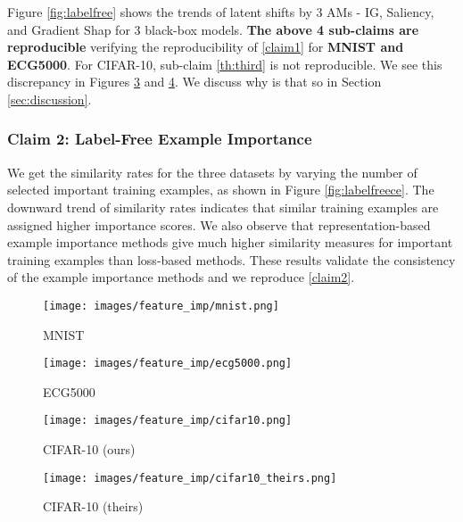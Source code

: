 Figure \ref{fig:labelfree} shows the trends of latent shifts by 3 AMs - IG, Saliency, and Gradient Shap for 3 black-box models. \textbf{The above 4 sub-claims are reproducible} verifying the reproducibility of 
\ref{claim1} for \textbf{MNIST and ECG5000}. For CIFAR-10, sub-claim \ref{th:third} is not reproducible. We see this discrepancy in Figures \ref{fig:cifar10} and \ref{fig:cifar10their}. We discuss why is that so in Section \ref{sec:discussion}. 
 

\subsubsection{Claim 2: Label-Free Example Importance}
\label{exampleimpresult}
We get the similarity rates for the three datasets by varying the number of selected important training examples, as shown in Figure \ref{fig:labelfreece}. The downward trend of similarity rates indicates that similar training examples are assigned higher importance scores. We also observe that representation-based example importance methods give much higher similarity measures for important training examples than loss-based methods. These results validate the consistency of the example importance methods and we reproduce \ref{claim2}.


\begin{figure*}[!h]
\centering
\begin{subfigure}[b]{0.24\linewidth}
\texttt{[image: images/feature\_imp/mnist.png]}
\caption{MNIST}\label{fig:mnist}
\end{subfigure}
\begin{subfigure}[b]{0.24\linewidth}
\texttt{[image: images/feature\_imp/ecg5000.png]} 
\caption{ECG5000}\label{fig:ecg5000}
\end{subfigure}
\begin{subfigure}[b]{0.24\linewidth}
\texttt{[image: images/feature\_imp/cifar10.png]} 
\caption{CIFAR-10 (ours)}\label{fig:cifar10}
\end{subfigure}
\begin{subfigure}[b]{0.24\linewidth}
\texttt{[image: images/feature\_imp/cifar10\_theirs.png]} 
\caption{CIFAR-10 (theirs)}\label{fig:cifar10their}
\end{subfigure}
\caption{Consistency check for label-free feature importance.}\label{fig:labelfree}
\end{figure*}

